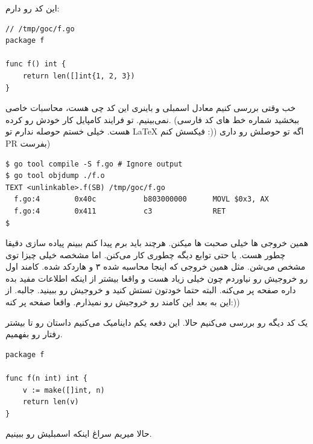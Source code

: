 این کد رو دارم:

\begin{latin}
\begin{verbatim}
// /tmp/goc/f.go
package f

func f() int {
    return len([]int{1, 2, 3})
}
\end{verbatim}
\end{latin}

خب وقتی بررسی کنیم معادل اسمبلی و باینری این کد چی هست، محاسبات خاصی نمی‌بینیم. تو فرایند کامپایل  کار خودش رو کرده.
(ببخشید شماره خط های کد فارسی هست. خیلی خستم حوصله ندارم تو LaTeX فیکسش کنم :)) اگه تو حوصلش رو داری PR بفرست)
\begin{latin}
\begin{verbatim}
$ go tool compile -S f.go # Ignore output
$ go tool objdump ./f.o
TEXT <unlinkable>.f(SB) /tmp/goc/f.go
  f.go:4        0x40c           b803000000      MOVL $0x3, AX       
  f.go:4        0x411           c3              RET         
$
\end{verbatim}
\end{latin}

همین خروجی ها خیلی صحبت ها میکنن. هرچند باید برم پیدا کنم ببینم پیاده سازی  دقیقا چطور هست. یا حتی توابع دیگه چطوری کار می‌کنن.
اما مشخصه خیلی چیزا توی  مشخص می‌شن. مثل همین خروجی  که اینجا محاسبه شده ۳ و هاردکد شده. کامند اول رو خروجیش
رو نیاوردم چون خیلی زیاد هست و واقعا بیشتر از اینکه اطلاعات مفید بده داره صفحه پر می‌کنه. البته حتما خودتون تستش کنید و خروجیش رو ببینید. جالبه.
از این به بعد این کامند رو خروجیش رو نمیذارم. واقعا صفحه پر کنه:))

یک کد دیگه رو بررسی می‌کنیم حالا. این دفعه یکم داینامیک می‌کنیم داستان رو تا بیشتر رفتار  رو بفهمیم.

\begin{latin}
\begin{verbatim}
package f

func f(n int) int {
    v := make([]int, n)
    return len(v)
}
\end{verbatim}
\end{latin}

حالا میریم سراغ اینکه اسمبلیش رو ببینیم.

